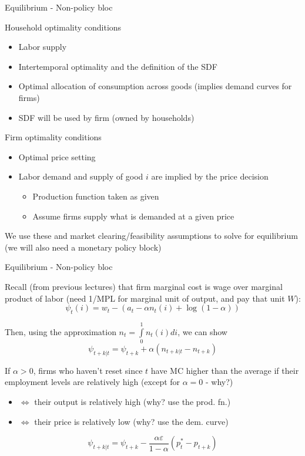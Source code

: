 \documentclass{beamer}
\begin{document}
\begin{frame}[label=jumpback]{Equilibrium - Non-policy bloc}

Household optimality conditions
\begin{itemize}
\item	Labor supply
\item	Intertemporal optimality and the definition of the SDF
\item	Optimal allocation of consumption across goods (implies demand curves for firms)
\item	SDF will be used by firm (owned by households)
\end{itemize}

\vspace{2mm}
Firm optimality conditions
\begin{itemize}
\item	Optimal price setting
\item	Labor demand and supply of good $i$ are implied by the price decision
	\begin{itemize}
	\item	Production function taken as given
	\item	Assume firms supply what is demanded at a given price
	\end{itemize}
\end{itemize}

\vspace{2mm}
We use these and market clearing/feasibility assumptions to solve for equilibrium (we will also need a monetary policy block)
\hyperlink{jump}{}

\end{frame}


	
\begin{frame}{Equilibrium - Non-policy bloc}

Recall (from previous lectures) that firm marginal cost is wage over marginal product of labor (need 1/MPL for marginal unit of output, and pay that unit $W$):
\[
\psi_{t}(i) = w_{t} - \left( a_{t} - \alpha n_{t}(i) + \log{(1-\alpha)} \right)
\]

Then, using the approximation $n_{t}=\int\limits_{0}^{1} n_{t}(i)di$, we can show
\[
\psi_{t+k|t} = \psi_{t+k} + \alpha (n_{t+k|t} - n_{t+k})
\]

If $\alpha>0$, firms who haven't reset since $t$ have MC higher than the average if their employment levels are relatively high (except for $\alpha=0$ - why?)
\begin{itemize}
\item	$\Leftrightarrow$ their output is relatively high (why? use the prod. fn.)
\item	$\Leftrightarrow$ their price is relatively low (why? use the dem. curve)
\end{itemize}

\[
\psi_{t+k|t} = \psi_{t+k} - \frac{\alpha \varepsilon}{1-\alpha} (p_{t}^{\ast} - p_{t+k})
\]


\end{frame}
\end{document}
